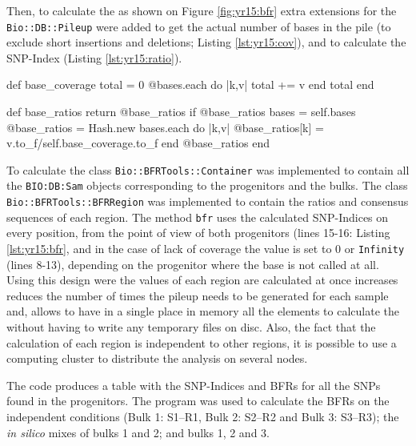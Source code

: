 Then, to calculate the  as shown on Figure \ref{fig:yr15:bfr} extra extensions for the \texttt{Bio::DB::Pileup} were added to get the actual number of bases in the pile (to exclude short insertions and deletions; Listing \ref{lst:yr15:cov}), and to calculate the SNP-Index (Listing \ref{lst:yr15:ratio}).  

\begin{code}[language=Ruby,caption=\texttt{base\_coverage} gets the number of bases called from a single pileup., label=lst:yr15:cov]
def base_coverage
  total = 0
  @bases.each do |k,v|
    total += v  
  end
  total
end
\end{code}

\begin{code}[language=Ruby,caption=\texttt{base\_ratios} gets the SNP-Index on a single pileup., label=lst:yr15:ratio]
def base_ratios
  return @base_ratios if @base_ratios
  bases = self.bases
  @base_ratios = Hash.new
  bases.each do |k,v| 
    @base_ratios[k] = v.to_f/self.base_coverage.to_f 
  end
  @base_ratios
 end
\end{code}

To calculate  the class \texttt{Bio::BFRTools::Container} was implemented to contain all the \texttt{BIO:DB:Sam} objects corresponding to the progenitors and the bulks. 
The class \texttt{Bio::BFRTools::BFRRegion}  was implemented to contain the ratios and consensus sequences of each region. 
The method \texttt{bfr} uses the calculated SNP-Indices on every position, from the point of view of both progenitors (lines 15-16: Listing \ref{lst:yr15:bfr}, and in the case of lack of coverage the value is set to 0 or \texttt{Infinity} (lines 8-13), depending on the progenitor where the base is not called at all. 
Using this design were the values of each region are calculated at once increases reduces the number of times the pileup needs to be generated for each sample and, allows to have in a single place in memory all the elements to calculate the  without having to write any temporary files on disc. 
Also, the fact that the calculation of each region is independent to other regions, it is possible to use a computing cluster to distribute the analysis on several nodes.

The code produces a table with the SNP-Indices and BFRs for all the SNPs found in the progenitors. 
The program was used to calculate the BFRs on the independent conditions (Bulk 1: S1–R1, Bulk 2: S2–R2 and Bulk 3: S3–R3); the \textit{in silico} mixes of bulks 1 and 2; and bulks 1, 2 and 3. 


